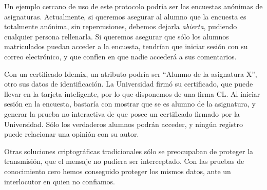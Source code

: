 \hfil

Un ejemplo cercano de uso de este protocolo podría ser las encuestas anónimas de asignaturas. Actualmente, si queremos asegurar al alumno que la encuesta es totalmente anónima, sin repercusiones, debemos dejarla \textit{abierta}, pudiendo cualquier persona rellenarla. Si queremos asegurar que sólo los alumnos matriculados puedan acceder a la encuesta, tendrían que iniciar sesión con su correo electrónico, y que confíen en que nadie accederá a sus comentarios.

Con un certificado Idemix, un atributo podría ser ``Alumno de la asignatura X'', otro sus datos de identificación. La Universidad firmó su certificado, que puede llevar en la tarjeta inteligente, por lo que disponemos de una firma CL. Al iniciar sesión en la encuesta, bastaría con mostrar que se es alumno de la asignatura, y generar la prueba no interactiva de que posee un certificado firmado por la Universidad. Sólo los verdaderos alumnos podrán acceder, y ningún registro puede relacionar una opinión con su autor.

Otras soluciones criptográficas tradicionales sólo se preocupaban de proteger la transmisión, que el mensaje no pudiera ser interceptado. Con las pruebas de conocimiento cero hemos conseguido proteger los mismos datos, ante un interlocutor en quien no confiamos.










